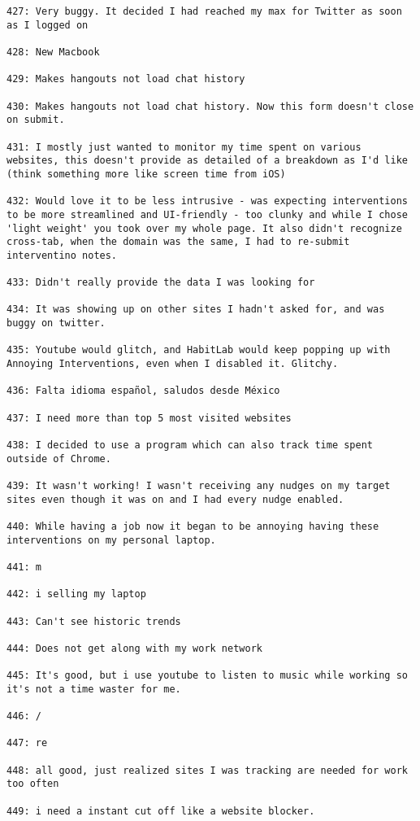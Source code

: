 \begin{lstlisting}[breaklines]
427: Very buggy. It decided I had reached my max for Twitter as soon as I logged on

428: New Macbook

429: Makes hangouts not load chat history

430: Makes hangouts not load chat history. Now this form doesn't close on submit.

431: I mostly just wanted to monitor my time spent on various websites, this doesn't provide as detailed of a breakdown as I'd like (think something more like screen time from iOS)

432: Would love it to be less intrusive - was expecting interventions to be more streamlined and UI-friendly - too clunky and while I chose 'light weight' you took over my whole page. It also didn't recognize cross-tab, when the domain was the same, I had to re-submit interventino notes.

433: Didn't really provide the data I was looking for

434: It was showing up on other sites I hadn't asked for, and was buggy on twitter.

435: Youtube would glitch, and HabitLab would keep popping up with Annoying Interventions, even when I disabled it. Glitchy.

436: Falta idioma español, saludos desde México

437: I need more than top 5 most visited websites

438: I decided to use a program which can also track time spent outside of Chrome.

439: It wasn't working! I wasn't receiving any nudges on my target sites even though it was on and I had every nudge enabled.

440: While having a job now it began to be annoying having these interventions on my personal laptop.

441: m

442: i selling my laptop

443: Can't see historic trends

444: Does not get along with my work network

445: It's good, but i use youtube to listen to music while working so it's not a time waster for me.

446: /

447: re

448: all good, just realized sites I was tracking are needed for work too often

449: i need a instant cut off like a website blocker.


\end{lstlisting}
